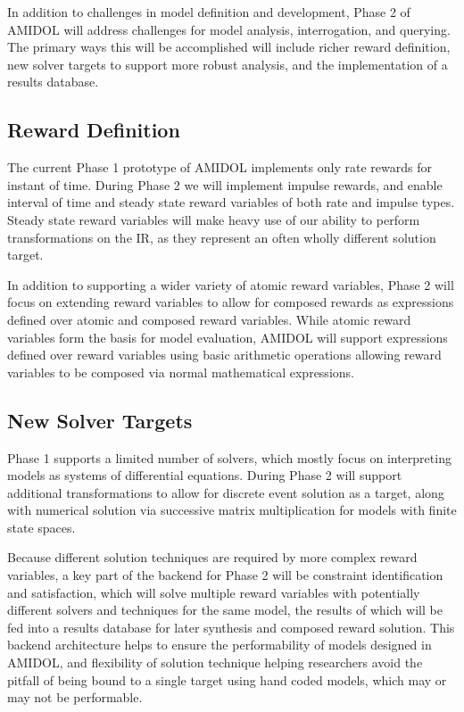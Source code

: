 \documentclass[11pt]{article}
\newcommand{\amidol}{\textsc{AMIDOL}}
\begin{document}
In addition to challenges in model definition and development, Phase 2
of \amidol{} will address challenges for model analysis,
interrogation, and querying.  The primary ways this will be
accomplished will include richer reward definition, new solver targets
to support more robust analysis, and the implementation of a results database.

\subsection{Reward Definition}

The current Phase 1 prototype of \amidol{} implements only rate
rewards for instant of time.  During Phase 2 we will implement impulse
rewards, and enable interval of time and steady state reward variables
of both rate and impulse types. Steady state reward variables will
make heavy use of our ability to perform transformations on the IR, as
they represent an often wholly different solution target.

In addition to supporting a wider variety of atomic reward variables,
Phase 2 will focus on extending reward variables to allow for composed
rewards as expressions defined over atomic and composed reward
variables. While atomic reward variables form the
basis for model evaluation, \amidol{} will support expressions defined
over reward variables using basic arithmetic operations allowing
reward variables to be composed via normal mathematical expressions.

\subsection{New Solver Targets}

Phase 1 supports a limited number of solvers, which mostly focus on
interpreting models as systems of differential equations.  During
Phase 2 will support additional transformations to allow for discrete
event solution as a target, along with numerical solution via
successive matrix multiplication for models with finite state spaces.

Because different solution techniques are required by more complex
reward variables, a key part of the backend for Phase 2 will be
constraint identification and satisfaction, which will solve multiple
reward variables with potentially different solvers and techniques for
the same model, the results of which will be fed into a results
database for later synthesis and composed reward solution.  This
backend architecture helps to ensure the performability of models
designed in \amidol{}, and flexibility of solution technique helping
researchers avoid the pitfall of being bound to a single target using
hand coded models, which may or may not be performable.
\end{document}
